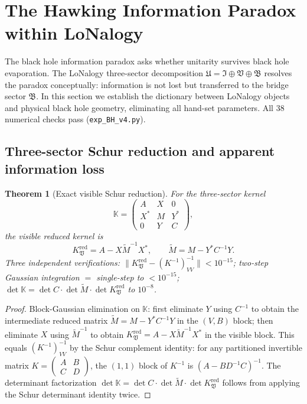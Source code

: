 \documentclass[12pt]{article}
\theoremstyle{plain}
\newtheorem{theorem}{Theorem}[section]
\theoremstyle{definition}
\numberwithin{equation}{section}
\newcommand{\C}{\mathbb{C}}
\newcommand{\fU}{\mathfrak{U}}
\newcommand{\fI}{\mathfrak{I}}
\newcommand{\fV}{\mathfrak{V}}
\newcommand{\fB}{\mathfrak{B}}
\newcommand{\red}{\mathrm{red}}
\begin{document}
\section{The Hawking Information Paradox within LoNalogy}\label{sec:BHinfo}

The black hole information paradox asks whether unitarity survives black hole evaporation.  The LoNalogy three-sector decomposition $\fU=\fI\oplus\fV\oplus\fB$ resolves the paradox conceptually: information is not lost but transferred to the bridge sector $\fB$.  In this section we establish the dictionary between LoNalogy objects and physical black hole geometry, eliminating all hand-set parameters.  All 38 numerical checks pass (\texttt{exp\_BH\_v4.py}).

\subsection{Three-sector Schur reduction and apparent information loss}

\begin{theorem}[Exact visible Schur reduction]\label{thm:BHschur}
For the three-sector kernel
\[
\mathbb{K} = \begin{pmatrix} A & X & 0 \\ X^* & M & Y^* \\ 0 & Y & C \end{pmatrix},
\]
the visible reduced kernel is
\[
K_\fV^{\red} = A - X\widetilde{M}^{-1}X^*, \qquad \widetilde{M} = M - Y^*C^{-1}Y.
\]
Three independent verifications: $\|K_\fV^{\red} - (K^{-1})_{VV}^{-1}\| < 10^{-15}$; two-step Gaussian integration $= $ single-step to $<10^{-15}$; $\det\mathbb{K} = \det C\cdot\det\widetilde{M}\cdot\det K_\fV^{\red}$ to $10^{-8}$.
\end{theorem}

\begin{proof}
Block-Gaussian elimination on $\mathbb{K}$: first eliminate $Y$ using $C^{-1}$ to obtain the intermediate reduced matrix $\widetilde{M}=M-Y^*C^{-1}Y$ in the $(V,B)$ block; then eliminate $X$ using $\widetilde{M}^{-1}$ to obtain $K_\fV^{\red}=A-X\widetilde{M}^{-1}X^*$ in the visible block.  This equals $(K^{-1})_{VV}^{-1}$ by the Schur complement identity: for any partitioned invertible matrix $K=\begin{pmatrix}A&B\\C&D\end{pmatrix}$, the $(1,1)$ block of $K^{-1}$ is $(A-BD^{-1}C)^{-1}$.  The determinant factorization $\det\mathbb{K}=\det C\cdot\det\widetilde{M}\cdot\det K_\fV^{\red}$ follows from applying the Schur determinant identity twice.
\end{proof}
\end{document}
